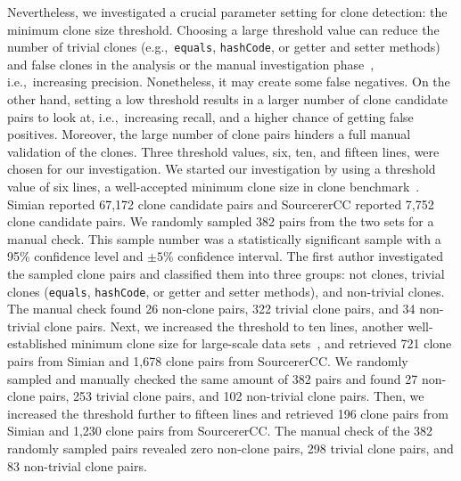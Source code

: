 \documentclass[10pt,journal,compsoc]{IEEEtran}
\begin{document}
Nevertheless, we investigated a crucial parameter setting for clone detection: 
the minimum clone size threshold.
Choosing a large threshold value can reduce the number of trivial clones
(e.g.,~\texttt{equals}, \texttt{hashCode}, or getter and setter methods) and
false clones in the analysis or the manual investigation
phase~\cite{Sajnani2016}, i.e.,~increasing precision. 
Nonetheless, it may create some false negatives. 
On the other hand, setting a low threshold
results in a larger number of clone candidate pairs to look at, i.e.,~increasing recall, 
and a higher chance of getting false positives. 
Moreover, the large number of clone
pairs hinders a full manual validation of the clones.
Three threshold values, six, ten, and fifteen lines, were chosen for our
investigation. We started our investigation by using a threshold value of six
lines, a well-accepted minimum clone size in clone benchmark~\cite{Bellon2007}.
Simian reported 67,172 clone candidate pairs and SourcererCC reported 7,752
clone candidate pairs. We randomly sampled 382 pairs from the two sets for
a manual check. This sample number was a statistically significant sample with a
95\% confidence level and $\pm 5\%$ confidence interval. The first author
investigated the sampled clone pairs and classified them into three groups:
not clones, trivial clones (\texttt{equals}, \texttt{hashCode}, or getter and
setter methods), and non-trivial clones. The manual check found 26 non-clone
pairs, 322 trivial clone pairs, and 34 non-trivial clone pairs. Next, we increased the
threshold to ten lines, another well-established minimum clone size for
large-scale data sets~\cite{Sajnani2016}, and retrieved 721 clone pairs from
Simian and 1,678 clone pairs from SourcererCC. We randomly sampled and manually
checked the same amount of 382 pairs and found 27 non-clone pairs, 253 trivial
clone pairs, and 102 non-trivial clone pairs. Then, we increased the threshold
further to fifteen lines and retrieved 196 clone pairs from Simian and 1,230
clone pairs from SourcererCC. The manual check of the 382 randomly sampled pairs
revealed zero non-clone pairs, 298 trivial clone pairs, and 83 non-trivial clone
pairs.
\end{document}
